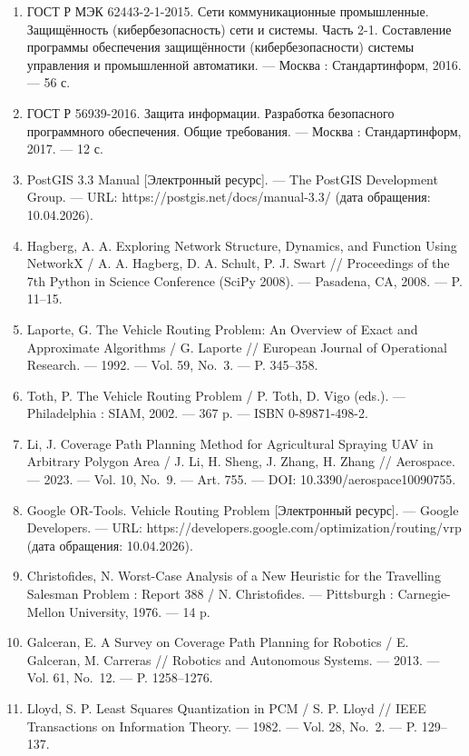 \documentclass[14pt,a4paper]{extarticle}
\begin{document}
\begin{enumerate}
  ArduPilot Copter Documentation {[}Электронный ресурс{]}. --- URL: https://ardupilot.org/copter/ (дата обращения: 10.04.2026).
\item
  ГОСТ Р МЭК 62443-2-1-2015. Сети коммуникационные промышленные. Защищённость (кибербезопасность) сети и системы. Часть 2-1. Составление программы обеспечения защищённости (кибербезопасности) системы управления и промышленной автоматики. --- Москва : Стандартинформ, 2016. --- 56 с.
\item
  ГОСТ Р 56939-2016. Защита информации. Разработка безопасного программного обеспечения. Общие требования. --- Москва : Стандартинформ, 2017. --- 12 с.
\item
  PostGIS 3.3 Manual {[}Электронный ресурс{]}. --- The PostGIS Development Group. --- URL: https://postgis.net/docs/manual-3.3/ (дата обращения: 10.04.2026).
\item
  Hagberg, A. A. Exploring Network Structure, Dynamics, and Function Using NetworkX / A. A. Hagberg, D. A. Schult, P. J. Swart // Proceedings of the 7th Python in Science Conference (SciPy 2008). --- Pasadena, CA, 2008. --- P. 11--15.
\item
  Laporte, G. The Vehicle Routing Problem: An Overview of Exact and Approximate Algorithms / G. Laporte // European Journal of Operational Research. --- 1992. --- Vol. 59, No.~3. --- P. 345--358.
\item
  Toth, P. The Vehicle Routing Problem / P. Toth, D. Vigo (eds.). --- Philadelphia : SIAM, 2002. --- 367 p. --- ISBN 0-89871-498-2.
\item
  Li, J. Coverage Path Planning Method for Agricultural Spraying UAV in Arbitrary Polygon Area / J. Li, H. Sheng, J. Zhang, H. Zhang // Aerospace. --- 2023. --- Vol. 10, No.~9. --- Art. 755. --- DOI: 10.3390/aerospace10090755.
\item
  Google OR-Tools. Vehicle Routing Problem {[}Электронный ресурс{]}. --- Google Developers. --- URL: https://developers.google.com/optimization/routing/vrp (дата обращения: 10.04.2026).
\item
  Christofides, N. Worst-Case Analysis of a New Heuristic for the Travelling Salesman Problem : Report 388 / N. Christofides. --- Pittsburgh : Carnegie-Mellon University, 1976. --- 14 p.
\item
  Galceran, E. A Survey on Coverage Path Planning for Robotics / E. Galceran, M. Carreras // Robotics and Autonomous Systems. --- 2013. --- Vol. 61, No.~12. --- P. 1258--1276.
\item
  Lloyd, S. P. Least Squares Quantization in PCM / S. P. Lloyd // IEEE Transactions on Information Theory. --- 1982. --- Vol. 28, No.~2. --- P. 129--137.

\end{enumerate}
\end{document}
